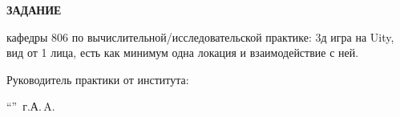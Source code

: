 \begin{center}
\bfseries{\large ЗАДАНИЕ}
\end{center}

кафедры 806 по вычислительной/исследовательской практике:\newline
3д игра на Uity, вид от 1 лица, есть как минимум одна локация и взаимодействие с ней.

\vspace*{\fill}
Руководитель практики от института:

\vspace{5pt}
\enquote{\hspace{0.5cm}}  \the\year\,г. А.\,A. 
\pagebreak
